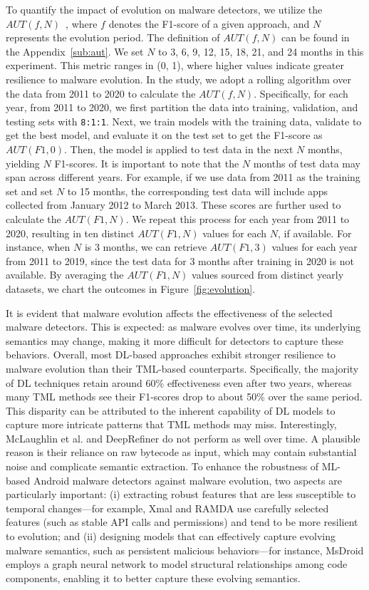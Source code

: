 To quantify the impact of evolution on malware detectors, we utilize the $AUT(f, N)$~\cite{pendlebury2019tesseract}, where $f$ denotes the F1-score of a given approach, and $N$ represents the evolution period. 
The definition of $AUT(f, N)$ can be found in the Appendix~\ref{sub:aut}.
We set $N$ to 3, 6, 9, 12, 15, 18, 21, and 24 months in this experiment.
This metric ranges in (0, 1), where higher values indicate greater resilience to malware evolution.
In the study, we adopt a rolling algorithm over the data from 2011 to 2020 to calculate the $AUT(f, N)$.
Specifically, for each year, from 2011 to 2020, we first partition the data into training, validation, and testing sets with \texttt{8:1:1}.
Next, we train models with the training data, validate to get the best model, and evaluate it on the test set to get the F1-score as $AUT(F1, 0)$.
Then, the model is applied to test data in the next $N$ months, yielding $N$ F1-scores.
It is important to note that the $N$ months of test data may span across different years.
For example, if we use data from 2011 as the training set and set $N$ to 15 months, the corresponding test data will include apps collected from January 2012 to March 2013.
These scores are further used to calculate the $AUT(F1, N)$.
We repeat this process for each year from 2011 to 2020, resulting in ten distinct $AUT(F1, N)$ values for each $N$, if available.
For instance, when $N$ is 3 months, we can retrieve $AUT(F1, 3)$ values for each year from 2011 to 2019, since the test data for 3 months after training in 2020 is not available.
By averaging the $AUT(F1, N)$ values sourced from distinct yearly datasets, we chart the outcomes in Figure~\ref{fig:evolution}.

It is evident that malware evolution affects the effectiveness of the selected malware detectors.
This is expected: as malware evolves over time, its underlying semantics may change, making it more difficult for detectors to capture these behaviors.
Overall, most DL-based approaches exhibit stronger resilience to malware evolution than their TML-based counterparts.
Specifically, the majority of DL techniques retain around 60\% effectiveness even after two years, whereas many TML methods see their F1-scores drop to about 50\% over the same period.
This disparity can be attributed to the inherent capability of DL models to capture more intricate patterns that TML methods may miss.
Interestingly, McLaughlin et al. and DeepRefiner do not perform as well over time.
A plausible reason is their reliance on raw bytecode as input, which may contain substantial noise and complicate semantic extraction.
To enhance the robustness of ML-based Android malware detectors against malware evolution, two aspects are particularly important:
(i) extracting robust features that are less susceptible to temporal changes—for example, Xmal and RAMDA use carefully selected features (such as stable API calls and permissions) and tend to be more resilient to evolution;
and (ii) designing models that can effectively capture evolving malware semantics, such as persistent malicious behaviors—for instance, MsDroid employs a graph neural network to model structural relationships among code components, enabling it to better capture these evolving semantics.

